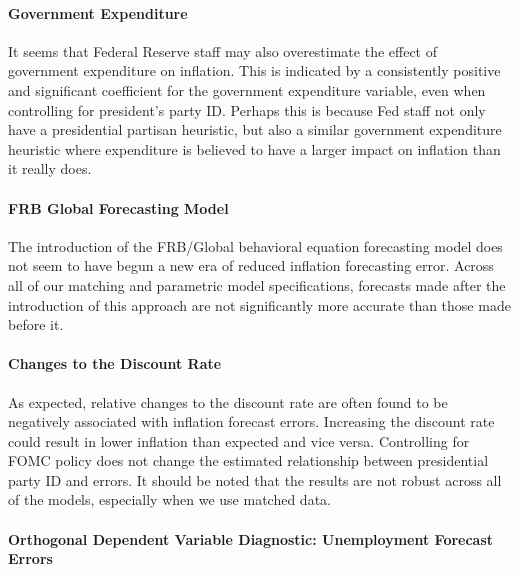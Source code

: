 \documentclass[a4paper]{article}\usepackage{graphicx, color}
\begin{document}
\paragraph{Government Expenditure}

It seems that Federal Reserve staff may also overestimate the effect of government expenditure on inflation. This is indicated by a consistently positive and significant coefficient for the government expenditure variable, even when controlling for president's party ID. Perhaps this is because Fed staff not only have a presidential partisan heuristic, but also a similar government expenditure heuristic where expenditure is believed to have a larger impact on inflation than it really does.

\paragraph{FRB Global Forecasting Model}

The introduction of the FRB/Global behavioral equation forecasting model does not seem to have begun a new era of reduced inflation forecasting error. Across all of our matching and parametric model specifications, forecasts made after the introduction of this approach are not significantly more accurate than those made before it. 

\paragraph{Changes to the Discount Rate}

As expected, relative changes to the discount rate are often found to be negatively associated with inflation forecast errors. Increasing the discount rate could result in lower inflation than expected and vice versa. Controlling for FOMC policy does not change the estimated relationship between presidential party ID and errors. It should be noted that the results are not robust across all of the models, especially when we use matched data. 




\paragraph{Orthogonal Dependent Variable Diagnostic: Unemployment Forecast Errors}
\end{document}
